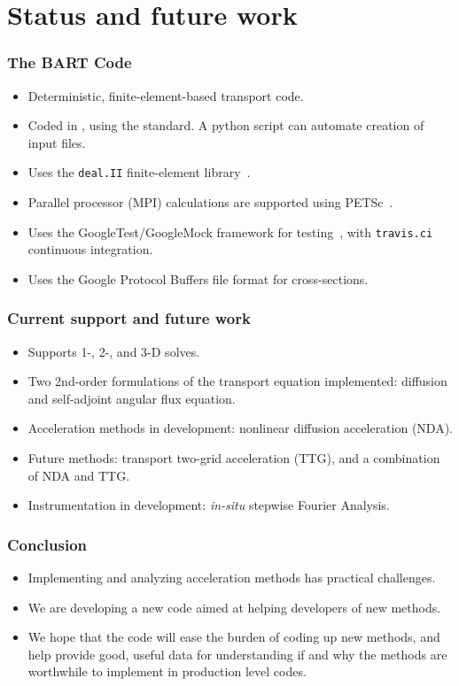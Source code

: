\documentclass[xcolor=x11names, compress, handout]{beamer}
\begin{document}
\section{Status and future work}
\begin{frame}
  \frametitle{The BART Code}
  \begin{itemize}[<+->]
  \item Deterministic, finite-element-based transport code.
  \item Coded in \Cpp{}, using the \Cpp[17] standard. A python script can
    automate creation of input files.
  \item Uses the \texttt{deal.II} finite-element library~\cite{dealII90}.
  \item Parallel processor (MPI) calculations are supported using
    PETSc~\cite{petsc-web-page, petsc-user-ref, petsc-efficient}.
  \item Uses the GoogleTest/GoogleMock framework for testing~\cite{googletest}, with
    \texttt{travis.ci} continuous integration.
  \item Uses the Google Protocol Buffers file format for cross-sections.
  \end{itemize}
\end{frame}

\begin{frame}
  \frametitle{Current support and future work}
  \begin{itemize}[<+->]    
  \item Supports 1-, 2-, and 3-D solves.
  \item Two 2nd-order formulations of the transport equation
    implemented: diffusion and self-adjoint angular flux equation.
  \item Acceleration methods in development: nonlinear diffusion
    acceleration (NDA).
  \item Future methods: transport two-grid acceleration (TTG), and a
    combination of NDA and TTG.
  \item Instrumentation in development: \textit{in-situ} stepwise Fourier Analysis.
  \end{itemize}
\end{frame}

\begin{frame}
  \frametitle{Conclusion}
  \pause
  \begin{itemize}[<+->]
  \item Implementing and analyzing acceleration methods has practical
    challenges.
  \item We are developing a new code aimed at helping developers of
    new methods.
  \item We hope that the code will ease the burden of coding up new
    methods, and help provide good, useful data for understanding if
    and why the methods are worthwhile to implement in production
    level codes.
  \end{itemize}
\end{frame}
\end{document}
